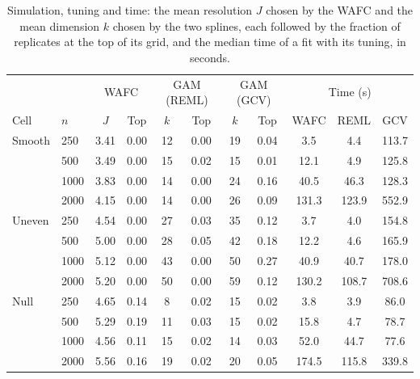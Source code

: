 \begin{table}[tp]
\color{colR1}
\caption{Simulation, tuning and time: the mean resolution $J$ chosen by the WAFC and the mean dimension $k$ chosen by the two splines, each followed by the fraction of replicates at the top of its grid, and the median time of a fit with its tuning, in seconds.}
\label{tab:sim-tuning}
\centering
\footnotesize
\setlength{\tabcolsep}{4pt}
\begin{tabular}{ll cc cc cc ccc}
\hline
 & & \multicolumn{2}{c}{WAFC} & \multicolumn{2}{c}{GAM (REML)} & \multicolumn{2}{c}{GAM (GCV)} & \multicolumn{3}{c}{Time (s)} \\
Cell & $n$ & $J$ & Top & $k$ & Top & $k$ & Top & WAFC & REML & GCV \\
\hline
Smooth & 250 & 3.41 & 0.00 & 12 & 0.00 & 19 & 0.04 & 3.5 & 4.4 & 113.7 \\
 & 500 & 3.49 & 0.00 & 15 & 0.02 & 15 & 0.01 & 12.1 & 4.9 & 125.8 \\
 & 1000 & 3.83 & 0.00 & 14 & 0.00 & 24 & 0.16 & 40.5 & 46.3 & 128.3 \\
 & 2000 & 4.15 & 0.00 & 14 & 0.00 & 26 & 0.09 & 131.3 & 123.9 & 552.9 \\
Uneven & 250 & 4.54 & 0.00 & 27 & 0.03 & 35 & 0.12 & 3.7 & 4.0 & 154.8 \\
 & 500 & 5.00 & 0.00 & 28 & 0.05 & 42 & 0.18 & 12.2 & 4.6 & 165.9 \\
 & 1000 & 5.12 & 0.00 & 43 & 0.00 & 50 & 0.27 & 40.9 & 40.7 & 178.0 \\
 & 2000 & 5.20 & 0.00 & 50 & 0.00 & 59 & 0.12 & 130.2 & 108.7 & 708.6 \\
Null & 250 & 4.65 & 0.14 & 8 & 0.02 & 15 & 0.02 & 3.8 & 3.9 & 86.0 \\
 & 500 & 5.29 & 0.19 & 11 & 0.03 & 15 & 0.02 & 15.8 & 4.7 & 78.7 \\
 & 1000 & 4.56 & 0.11 & 15 & 0.02 & 14 & 0.03 & 52.0 & 44.7 & 77.6 \\
 & 2000 & 5.56 & 0.16 & 19 & 0.02 & 20 & 0.05 & 174.5 & 115.8 & 339.8 \\
\hline
\end{tabular}
\end{table}

